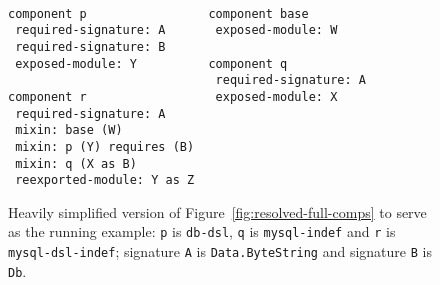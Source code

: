 \begin{figure}
\begin{verbatim}

component p                 component base
 required-signature: A       exposed-module: W
 required-signature: B
 exposed-module: Y          component q
                             required-signature: A
component r                  exposed-module: X
 required-signature: A
 mixin: base (W)
 mixin: p (Y) requires (B)
 mixin: q (X as B)
 reexported-module: Y as Z
\end{verbatim}
  \caption{Heavily simplified version of Figure~\ref{fig:resolved-full-comps} to serve as the running example: \texttt{p} is \texttt{db-dsl}, \texttt{q} is \texttt{mysql-indef} and \texttt{r} is \texttt{mysql-dsl-indef}; signature \texttt{A} is \texttt{Data.ByteString} and signature \texttt{B} is \texttt{Db}.}
  \label{fig:resolved-example}
\end{figure}

